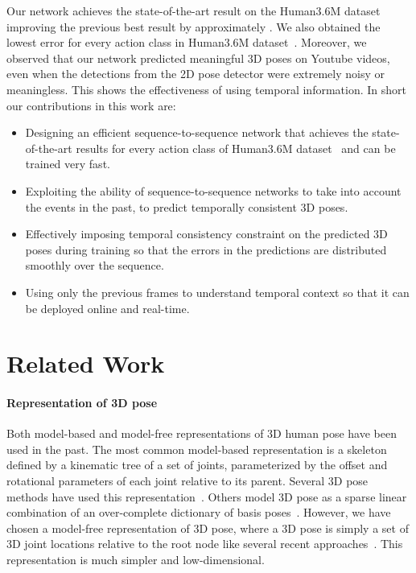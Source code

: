 \documentclass[runningheads]{llncs}
\begin{document}
Our network achieves the state-of-the-art result on the Human3.6M dataset improving the previous best result by approximately . We also obtained the lowest error for every action class in Human3.6M dataset~\cite{h36m_pami}. Moreover, we observed that our network predicted meaningful 3D poses on Youtube videos, even when the detections from the 2D pose detector were extremely noisy or meaningless. This shows the effectiveness of using temporal information. In short our contributions in this work are:
\begin{itemize}
\item Designing an efficient sequence-to-sequence network that achieves the state-of-the-art results for every action class of Human3.6M dataset~\cite{h36m_pami} and can be trained very fast.
\item Exploiting the ability of sequence-to-sequence networks to take into account the  events in the past, to predict temporally consistent 3D poses. 
\item Effectively imposing temporal consistency constraint on the predicted 3D poses during training so that the errors in the predictions are distributed smoothly over the sequence. 
\item Using only the previous frames to understand temporal context so that it can be deployed online and real-time.
\end{itemize}



\section{Related Work}
\paragraph{Representation of 3D pose}
Both model-based and model-free representations of 3D human pose have been used in the past. The most common model-based representation is a skeleton defined by a kinematic tree of a set of joints, parameterized by the offset and rotational parameters of each joint relative to its parent. Several 3D pose methods have used this representation~\cite{barron_2001,ParameswaranC04,bogo2016keep,zhou2016deep}. Others model 3D pose as a sparse linear combination of an over-complete dictionary of basis poses~\cite{akhter2015pose,zhou2016sparseness,ramakrishna2012reconstructing}. However, we have chosen a model-free representation of 3D pose, where a 3D pose is simply a set of 3D joint locations relative to the root node like several recent approaches~\cite{JMartinez:ICCV:2017,distance-matrix,li20143d,mehta2016monocular}. This representation is much simpler and low-dimensional.
\end{document}
